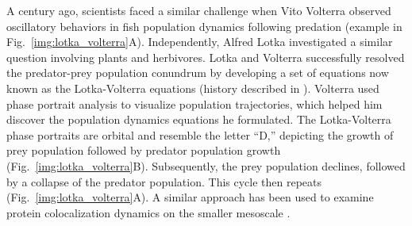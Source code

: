 A century ago, scientists faced a similar challenge when Vito Volterra observed oscillatory behaviors in fish population dynamics following predation (example in Fig.~\ref{img:lotka_volterra}A). Independently, Alfred Lotka investigated a similar question involving plants and herbivores. Lotka and Volterra successfully resolved the predator-prey population conundrum by developing a set of equations now known as the Lotka-Volterra equations (history described in \autocite{Ginoux_2017}). Volterra used phase portrait analysis to visualize population trajectories, which helped him discover the population dynamics equations he formulated. The Lotka-Volterra phase portraits are orbital and resemble the letter “D,” depicting the growth of prey population followed by predator population growth (Fig.~\ref{img:lotka_volterra}B). Subsequently, the prey population declines, followed by a collapse of the predator population. This cycle then repeats (Fig.~\ref{img:lotka_volterra}A). A similar approach has been used to examine protein colocalization dynamics on the smaller mesoscale \autocite{Yan_2022}.


